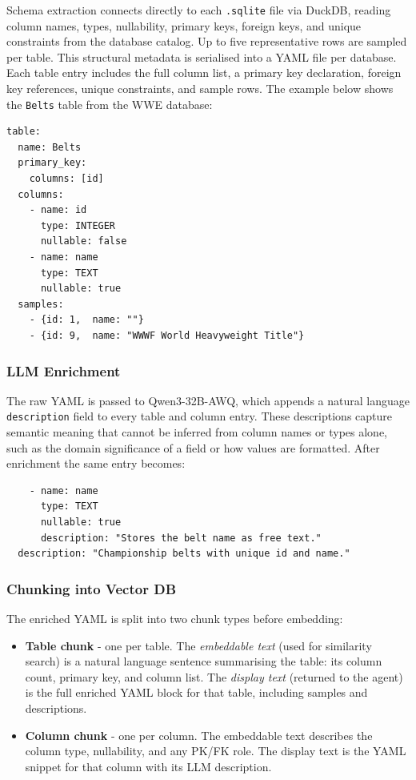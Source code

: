 Schema extraction connects directly to each \texttt{.sqlite} file via DuckDB, reading column names, types, nullability, primary keys, foreign keys, and unique constraints from the database catalog. Up to five representative rows are sampled per table. This structural metadata is serialised into a YAML file per database. Each table entry includes the full column list, a primary key declaration, foreign key references, unique constraints, and sample rows. The example below shows the \texttt{Belts} table from the WWE database:

\begingroup\small
\begin{verbatim}
table:
  name: Belts
  primary_key:
    columns: [id]
  columns:
    - name: id
      type: INTEGER
      nullable: false
    - name: name
      type: TEXT
      nullable: true
  samples:
    - {id: 1,  name: ""}
    - {id: 9,  name: "WWWF World Heavyweight Title"}
\end{verbatim}
\endgroup

\subsubsection{LLM Enrichment}

The raw YAML is passed to Qwen3-32B-AWQ, which appends a natural language \texttt{description} field to every table and column entry. These descriptions capture semantic meaning that cannot be inferred from column names or types alone, such as the domain significance of a field or how values are formatted. After enrichment the same entry becomes:

\begingroup\small
\begin{verbatim}
    - name: name
      type: TEXT
      nullable: true
      description: "Stores the belt name as free text."
  description: "Championship belts with unique id and name."
\end{verbatim}
\endgroup

\subsubsection{Chunking into Vector DB}

The enriched YAML is split into two chunk types before embedding:

\begin{itemize}
  \item \textbf{Table chunk} - one per table. The \emph{embeddable text} (used for similarity search) is a natural language sentence summarising the table: its column count, primary key, and column list. The \emph{display text} (returned to the agent) is the full enriched YAML block for that table, including samples and descriptions.
  \item \textbf{Column chunk} - one per column. The embeddable text describes the column type, nullability, and any PK/FK role. The display text is the YAML snippet for that column with its LLM description.
\end{itemize}


